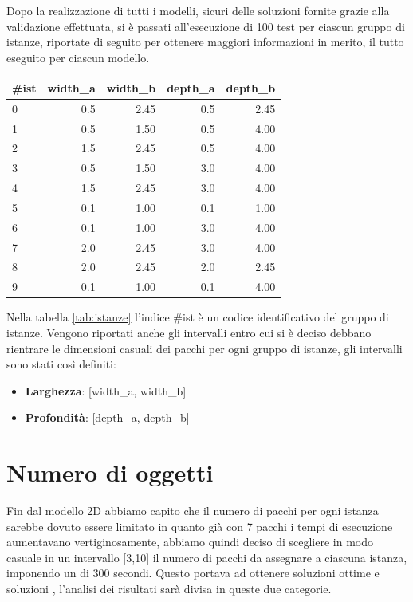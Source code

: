 Dopo la realizzazione di tutti i modelli, sicuri delle soluzioni fornite grazie alla validazione effettuata, si è passati all'esecuzione di 100 test per ciascun gruppo di istanze, riportate di seguito per ottenere maggiori informazioni in merito, il tutto eseguito per ciascun modello.
\begin{center}
	\begin{tabular}{lrrrr}
		\toprule
		{}
		\#ist & width\_a & width\_b & depth\_a & depth\_b \\
		\midrule
		0     & 0.5      & 2.45     & 0.5      & 2.45     \\
		1     & 0.5      & 1.50     & 0.5      & 4.00     \\
		2     & 1.5      & 2.45     & 0.5      & 4.00     \\
		3     & 0.5      & 1.50     & 3.0      & 4.00     \\
		4     & 1.5      & 2.45     & 3.0      & 4.00     \\
		5     & 0.1      & 1.00     & 0.1      & 1.00     \\
		6     & 0.1      & 1.00     & 3.0      & 4.00     \\
		7     & 2.0      & 2.45     & 3.0      & 4.00     \\
		8     & 2.0      & 2.45     & 2.0      & 2.45     \\
		9     & 0.1      & 1.00     & 0.1      & 4.00     \\
		\bottomrule
	\end{tabular}
	\label{tab:istanze}
\end{center}

Nella tabella \ref{tab:istanze} l'indice \#ist è un codice identificativo del gruppo di istanze. Vengono riportati anche gli intervalli entro cui si è deciso debbano rientrare le dimensioni casuali dei pacchi per ogni gruppo di istanze, gli intervalli sono stati così definiti:
\begin{itemize}
	\item \textbf{Larghezza}: [width\_a, width\_b]
	\item \textbf{Profondità}: [depth\_a, depth\_b]
\end{itemize}

\section{Numero di oggetti}
Fin dal modello 2D abbiamo capito che il numero di pacchi per ogni istanza sarebbe dovuto essere limitato in quanto già con 7 pacchi i tempi di esecuzione aumentavano vertiginosamente, abbiamo quindi deciso di scegliere in modo casuale in un intervallo [3,10] il numero di pacchi da assegnare a ciascuna istanza, imponendo un  di 300 secondi.
Questo portava ad ottenere soluzioni ottime e soluzioni , l'analisi dei risultati sarà divisa in queste due categorie.

